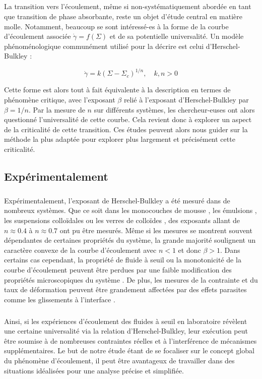 \subparagraph{}La transition vers l'écoulement, même si non-systématiquement abordée en tant que transition de phase absorbante, reste un objet d'étude central en matière molle. Notamment, beaucoup se sont intéressé-es à la forme de la courbe d'écoulement associée $\dot{\gamma} = f(\Sigma)$ et de sa potentielle universalité. Un modèle phénoménologique communément utilisé pour la décrire est celui d'Herschel-Bulkley \cite{herschel_konsistenzmessungen_1926} :

\begin{equation}
	\dot{\gamma} = k(\Sigma-\Sigma_c)^{1/n},\quad k,n > 0
\end{equation}

\noindent Cette forme est alors tout à fait équivalente à la description en termes de phénomène critique, avec l'exposant $\beta$ relié à l'exposant d'Herschel-Bulkley par $\beta = 1/n$. Par la mesure de $n$ sur différents systèmes, les chercheur-euses ont alors questionné l'universalité de cette courbe. Cela revient donc à explorer un aspect de la criticalité de cette transition. Ces études peuvent alors nous guider sur la méthode la plus adaptée pour explorer plus largement et précisément cette criticalité.


\subsection{Expérimentalement}

\subparagraph{}Expérimentalement, l'exposant de Herschel-Bulkley a été mesuré dans de nombreux systèmes. Que ce soit dans les monocouches de mousse \cite{katgert_flow_2009}, les émulsions \cite{becu_yielding_2006, jop_microscale_2012}, les suspensions colloïdales \cite{ovarlez_rheopexy_2013} ou les verres de colloïdes \cite{besseling_three_dimensional_2007}, des exposants allant de $n\approx 0.4$ à $n\approx 0.7$ ont pu être mesurés. Même si les mesures se montrent souvent dépendantes de certaines propriétés du système, la grande majorité soulignent un caractère convexe de la courbe d'écoulement avec $n<1$ et donc $\beta>1$. Dans certains cas cependant, la propriété de fluide à seuil ou la monotonicité de la courbe d’écoulement peuvent être perdues par une faible modification des propriétés microscopiques du système \cite{becu_yielding_2006}. De plus, les mesures de la contrainte et du taux de déformation peuvent être grandement affectées par des effets parasites comme les glissements à l'interface \cite{bonn_yield_2017}.

\subparagraph{}Ainsi, si les expériences d'écoulement des fluides à seuil en laboratoire révèlent une certaine universalité via la relation d'Herschel-Bulkley, leur exécution peut être soumise à de nombreuses contraintes réelles et à l'interférence de mécanismes supplémentaires. Le but de notre étude étant de se focaliser sur le concept global du phénomène d’écoulement, il peut être avantageux de travailler dans des situations idéalisées pour une analyse précise et simplifiée.


